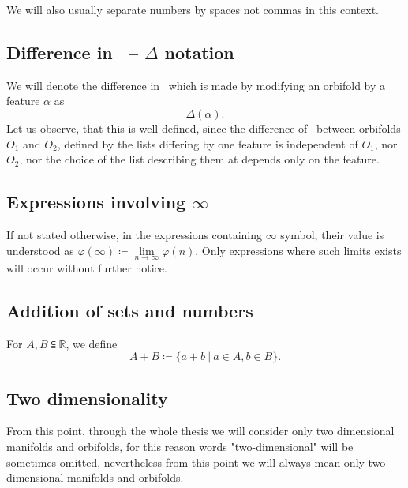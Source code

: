 We will also usually separate numbers by spaces not commas in this context. 

\subsection{Difference in \Eoc\ -- $\Delta$ notation}

We will denote the difference in \Eoc\ which is made by modifying 
an orbifold by a feature $\alpha$ as 
\begin{equation}
\Delta(\alpha).
\end{equation}
Let us observe, that this is well defined, since the difference of \Eoc\ between orbifolds 
$O_1$ and $O_2$, defined by the lists differing by one feature is independent of 
$O_1$, nor $O_2$, nor the choice of the list describing them at depends only on the feature.


\subsection{Expressions involving $\infty$}
If not stated otherwise, in the expressions containing $\infty$ symbol, their value is understood 
as $\varphi(\infty) \coloneqq \lim\limits_{n\to \infty}\varphi(n)$. Only expressions 
where such limits exists will occur without further notice.

\subsection{Addition of sets and numbers}
For $A, B \subseteqq \mathbb{R}$, we define 
\begin{equation}
A+B \coloneqq \{a+b\ |\ a \in A, b\in B\}.
\end{equation}

\subsection{Two dimensionality}
From this point, through the whole thesis we will consider only two dimensional manifolds and 
orbifolds, for this reason words "two-dimensional" will be sometimes omitted, nevertheless 
from this point we will always mean only two dimensional manifolds and orbifolds.  


